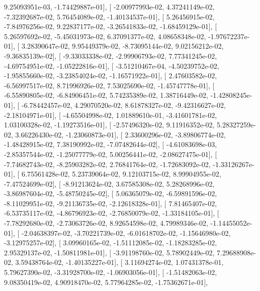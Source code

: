 \documentclass{article}
\begin{document}
          9.25093951e-03,  -1.74429887e-01],
       [ -2.00977993e-02,   4.37241149e-02,  -7.32392687e-02,
          5.76454089e-02,  -1.40134537e-01],
       [  5.26456915e-02,  -7.84976256e-02,   9.22837177e-02,
         -3.26541833e-02,  -1.68459129e-01],
       [  5.26597692e-02,  -5.45031973e-02,   6.37091377e-02,
          4.08658348e-02,  -1.97672237e-01],
       [  3.28390647e-02,   9.95449379e-02,  -8.73095144e-02,
          9.02156212e-02,  -9.36835139e-02],
       [ -9.33033338e-02,  -2.99906793e-02,   7.77341245e-02,
         -4.69754951e-02,  -1.05222816e-01],
       [ -3.51210467e-04,  -4.50239752e-02,  -1.95855660e-02,
         -3.23854024e-02,  -1.16571922e-01],
       [  2.47603582e-02,  -6.56997517e-02,   8.71996926e-02,
          7.53025690e-02,  -1.45747778e-01],
       [ -6.55890805e-02,  -6.84906451e-02,   5.74235389e-02,
          1.38716449e-02,  -1.42808245e-01],
       [ -6.78442457e-02,   4.29070520e-02,   8.61878327e-02,
         -9.42316627e-02,  -2.18104971e-01],
       [ -4.65504998e-02,   1.01889610e-01,  -3.41601781e-02,
          1.03100328e-02,  -1.19273516e-01],
       [ -2.57496320e-02,   9.11916352e-02,   5.28327259e-02,
          3.66226430e-02,  -1.23060873e-01],
       [  2.33600296e-02,  -3.89806774e-02,  -1.48428915e-02,
          7.38190992e-02,  -7.07482644e-02],
       [ -4.61083698e-03,  -2.85357544e-02,  -1.25077779e-02,
          5.00256441e-02,  -2.08627475e-01],
       [ -7.74682743e-02,  -8.25903282e-02,   2.76841764e-02,
         -1.72683092e-02,  -1.33126267e-01],
       [  6.75561428e-02,   5.23739064e-02,   9.12103715e-02,
          8.99904955e-02,  -7.47524699e-02],
       [ -8.91213624e-02,   3.67585308e-02,   5.28268996e-02,
         -3.86987604e-02,  -5.48750245e-02],
       [  5.06365079e-02,  -6.59891596e-02,  -8.11029951e-02,
         -9.21136735e-02,  -2.12618328e-01],
       [  7.81465407e-02,  -6.53735117e-02,  -4.86796923e-02,
         -2.76850079e-02,  -1.33184105e-01],
       [ -7.78292680e-02,  -2.73063726e-02,   8.92654598e-02,
          4.79989346e-02,  -1.14455052e-01],
       [ -2.04638397e-02,  -3.70221739e-02,  -6.01618702e-02,
         -1.15646980e-02,  -3.12975257e-02],
       [  3.09960165e-02,  -1.51112085e-02,  -1.18283285e-02,
          2.95329137e-02,  -1.50811981e-01],
       [ -3.91198760e-02,   5.78902449e-02,   7.29688908e-02,
          3.59438764e-02,  -1.40135227e-01],
       [  3.11694274e-02,   1.07431378e-01,   5.79627390e-02,
         -3.31928700e-02,  -1.06903056e-01],
       [ -1.51482063e-02,   9.08350419e-02,   4.90918470e-02,
          5.77964285e-02,  -1.75362671e-01],
\end{document}
